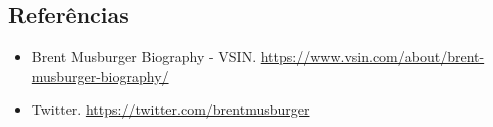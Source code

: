 \hypertarget{referuxeancias-1}{%
\subsection{Referências}\label{referuxeancias-1}}

\begin{itemize}
\tightlist
\item
  \sloppy Brent Musburger Biography - VSIN. \url{https://www.vsin.com/about/brent-musburger-biography/}
\item
  \sloppy Twitter. \url{https://twitter.com/brentmusburger}
\end{itemize}
